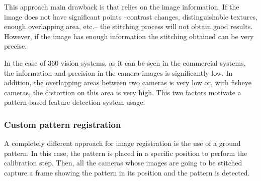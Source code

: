 This approach main drawback is that relies on the image information. If the image does not have significant points --contrast changes, distinguishable textures, enough overlapping area, etc.-- the stitching process will not obtain good results. However, if the image has enough information the stitching obtained can be very precise.

In the case of 360\degree{} vision systems, as it can be seen in the commercial systems, the information and precision in the camera images is significantly low. In addition, the overlapping areas between two cameras is very low or, with fisheye cameras, the distortion on this area is very high. This two factors motivate a pattern-based feature detection system usage.

\subsubsection{Custom pattern registration}
A completely different approach for image registration is the use of a ground pattern. In this case, the pattern is placed in a specific position to perform the calibration step. Then, all the cameras whose images are going  to be stitched capture a frame showing the pattern in its position and the pattern is detected. 

